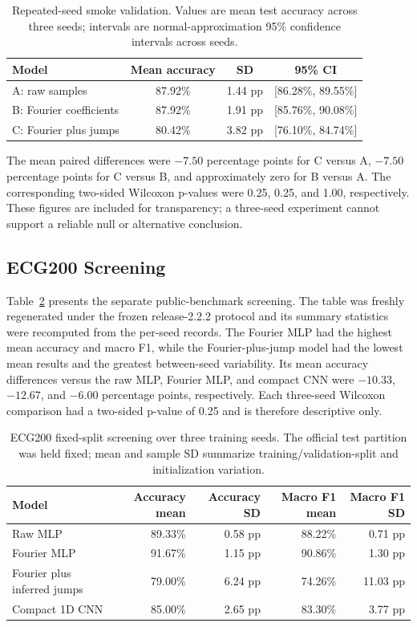 \documentclass[mathematics,article,submit,moreauthors,pdftex]{mdpi}
\begin{document}
\begin{table}[H]
\caption{Repeated-seed smoke validation. Values are mean test accuracy across three seeds; intervals are normal-approximation 95\% confidence intervals across seeds.}
\label{tab:pilot}
\centering
\begin{tabular}{lccc}
\toprule
Model & Mean accuracy & SD & 95\% CI \\
\midrule
A: raw samples & 87.92\% & 1.44 pp & [86.28\%, 89.55\%] \\
B: Fourier coefficients & 87.92\% & 1.91 pp & [85.76\%, 90.08\%] \\
C: Fourier plus jumps & 80.42\% & 3.82 pp & [76.10\%, 84.74\%] \\
\bottomrule
\end{tabular}
\end{table}

The mean paired differences were $-7.50$ percentage points for C versus A, $-7.50$ percentage points for C versus B, and approximately zero for B versus A. The corresponding two-sided Wilcoxon p-values were 0.25, 0.25, and 1.00, respectively. These figures are included for transparency; a three-seed experiment cannot support a reliable null or alternative conclusion.

\subsection{ECG200 Screening}

Table~\ref{tab:ecg200} presents the separate public-benchmark screening. The table was freshly regenerated under the frozen release-2.2.2 protocol and its summary statistics were recomputed from the per-seed records. The Fourier MLP had the highest mean accuracy and macro F1, while the Fourier-plus-jump model had the lowest mean results and the greatest between-seed variability. Its mean accuracy differences versus the raw MLP, Fourier MLP, and compact CNN were $-10.33$, $-12.67$, and $-6.00$ percentage points, respectively. Each three-seed Wilcoxon comparison had a two-sided p-value of 0.25 and is therefore descriptive only.

\begin{table}[H]
\caption{ECG200 fixed-split screening over three training seeds. The official test partition was held fixed; mean and sample SD summarize training/validation-split and initialization variation.}
\label{tab:ecg200}
\centering
\begin{tabular}{lrrrr}
\toprule
Model & Accuracy mean & Accuracy SD & Macro F1 mean & Macro F1 SD \\
\midrule
Raw MLP & 89.33\% & 0.58 pp & 88.22\% & 0.71 pp \\
Fourier MLP & 91.67\% & 1.15 pp & 90.86\% & 1.30 pp \\
Fourier plus inferred jumps & 79.00\% & 6.24 pp & 74.26\% & 11.03 pp \\
Compact 1D CNN & 85.00\% & 2.65 pp & 83.30\% & 3.77 pp \\
\bottomrule
\end{tabular}
\end{table}
\end{document}
